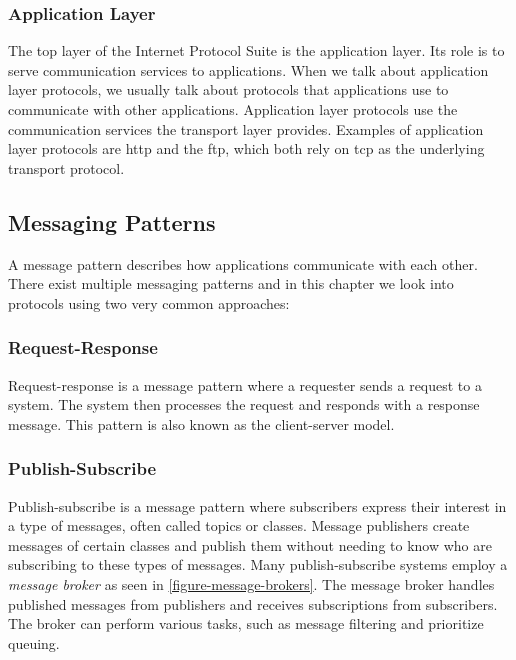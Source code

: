 \subsubsection{Application Layer}

The top layer of the Internet Protocol Suite is the application layer. Its role
is to serve communication services to applications. When we talk about
application layer protocols, we usually talk about protocols that applications
use to communicate with other applications. Application layer protocols use the
communication services the transport layer provides. Examples of application
layer protocols are \gls{http} and the \gls{ftp}, which both rely on \gls{tcp}
as the underlying transport protocol.

\subsection{Messaging Patterns}

A message pattern describes how applications communicate with each other. There
exist multiple messaging patterns and in this chapter we look into protocols
using two very common approaches:

\subsubsection{Request-Response}

Request-response is a message pattern where a requester sends a request to a
system. The system then processes the request and responds with a response
message. This pattern is also known as the client-server model.

\subsubsection{Publish-Subscribe}

Publish-subscribe is a message pattern where subscribers express their interest
in a type of messages, often called topics or classes. Message publishers create
messages of certain classes and publish them without needing to know who are
subscribing to these types of messages.  Many publish-subscribe systems employ a
\textit{message broker} as seen in \cref{figure-message-brokers}. The message
broker handles published messages from publishers and receives subscriptions
from subscribers. The broker can perform various tasks, such as message
filtering and prioritize queuing.

